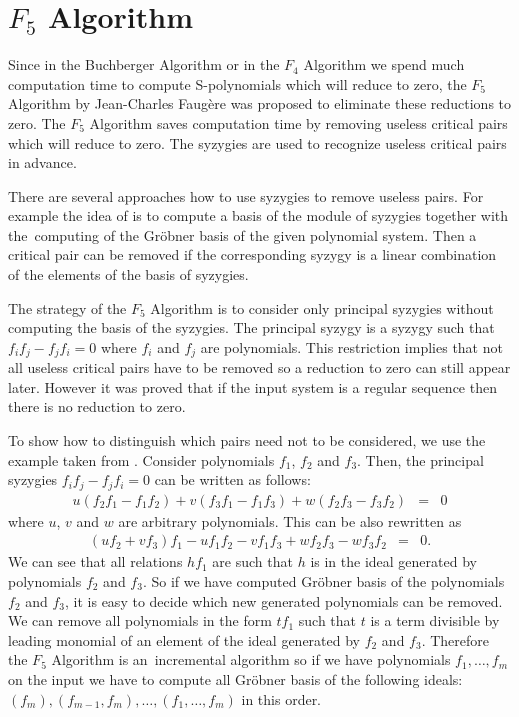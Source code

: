 

\section{$F_5$ Algorithm}
Since in the Buchberger Algorithm or in the $F_4$ Algorithm we spend much computation time to compute S-polynomials which will reduce to zero, the $F_5$ Algorithm \cite{F5} by Jean-Charles Faug\`ere was proposed to eliminate these reductions to zero. The $F_5$ Algorithm saves computation time by removing useless critical pairs which will reduce to zero. The syzygies \cite{Cox-Little-Shea97} are used to recognize useless critical pairs in advance.

There are several approaches how to use syzygies to remove useless pairs. For example the idea of \cite{GBSyzygies} is to compute a basis of the module of syzygies together with the~computing of the Gr\"obner basis of the given polynomial system. Then a critical pair can be removed if the corresponding syzygy is a linear combination of the elements of the basis of syzygies.

The strategy of the $F_5$ Algorithm is to consider only principal syzygies without computing the basis of the syzygies. The principal syzygy is a syzygy such that $f_if_j - f_jf_i = 0$ where $f_i$ and $f_j$ are polynomials. This restriction implies that not all useless critical pairs have to be removed so a reduction to zero can still appear later. However it was proved that if the input system is a regular sequence then there is no reduction to zero.

To show how to distinguish which pairs need not to be considered, we use the example taken from \cite{F5}. Consider polynomials $f_1$, $f_2$ and $f_3$. Then, the principal syzygies $f_if_j - f_jf_i = 0$ can be written as follows:
\begin{eqnarray}
  u(f_2f_1 - f_1f_2) + v(f_3f_1 - f_1f_3) + w(f_2f_3 - f_3f_2) &=& 0
\end{eqnarray}
where $u$, $v$ and $w$ are arbitrary polynomials. This can be also rewritten as
\begin{eqnarray}
  (uf_2 + vf_3)f_1 - uf_1f_2 - vf_1f_3 + wf_2f_3 - wf_3f_2 &=& 0.
\end{eqnarray}
We can see that all relations $hf_1$ are such that $h$ is in the ideal generated by polynomials $f_2$ and $f_3$. So if we have computed Gr\"obner basis of the polynomials $f_2$ and $f_3$, it is easy to decide which new generated polynomials can be removed. We can remove all polynomials in the form $t f_1$ such that $t$ is a term divisible by leading monomial of an element of the ideal generated by $f_2$ and $f_3$. Therefore the $F_5$ Algorithm is an~incremental algorithm so if we have polynomials $f_1, \dots, f_m$ on the input we have to compute all Gr\"obner basis of the following ideals: $(f_m), (f_{m-1}, f_m), \dots, (f_1, \dots, f_m)$ in this order.

